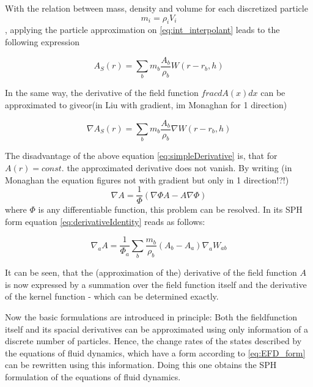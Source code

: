 \documentclass{report}
\begin{document}
With the relation between mass, density and volume for each discretized particle
\begin{equation}
m_i=\rho_i V_i
\end{equation},
applying the particle approximation on \ref{eq:int_interpolant} leads to the following expression

\begin{equation}
\label{eq:intInter}
A_S(r)=\sum_b m_b \frac{A_b}{\rho_b}W(r-r_b,h)
\end{equation}


In the same way, the derivative of the field function $frac{dA(x)}{dx}$ can be
approximated to give\cite{Monaghan2005}or\cite{Liu2003}(in Liu with gradient,
im Monaghan for 1 direction)

\begin{equation}
\label{eq:simpleDerivative}
\nabla A_S(r)=\sum_b m_b \frac{A_b}{\rho_b}\nabla W(r-r_b,h)
\end{equation}

The disadvantage of the above equation \ref{eq:simpleDerivative} is, that for
$A(r)=const.$ the approximated derivative does not vanish. By writing (in
Monaghan the equation figures not with gradient but only in 1 direction!?!)
\begin{equation}
\label{eq:derivativeIdentity}
\nabla A = \frac{1}{\Phi}(\nabla {\Phi A}-A\nabla \Phi)
\end{equation}
where $\Phi$ is any differentiable function, this problem can be resolved. In its
SPH form  equation \ref{eq:derivativeIdentity} reads as follows:

\begin{equation}
\nabla_a A = \frac{1}{\Phi_a}\sum_b \frac{m_b}{\rho_b}(A_b-A_a)\nabla_a W_{ab}
\end{equation}


It can be seen, that the (approximation of the) derivative of the
field function $A$ is now expressed by a summation over the field function itself
and the derivative of the kernel function - which can be determined exactly.

Now the basic formulations are introduced in principle: Both the fieldfunction
itself and its spacial derivatives can be approximated using only information of a discrete number of particles. Hence, the change rates of
the states described by the equations of fluid dynamics, which have a form
according to \ref{eq:EFD_form} can be rewritten using this information. Doing
this one obtains the SPH formulation of the equations of fluid dynamics.
\end{document}
